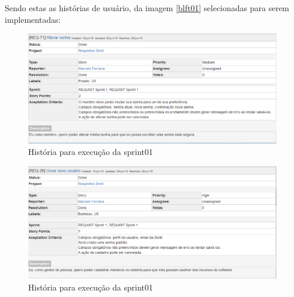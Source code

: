 Sendo estas as histórias de usuário, da imagem \ref{blft01} selecionadas para serem implementadas: 


\begin{figure}[H]
    \centering
    \includegraphics[keepaspectratio=true,scale=0.6]{figuras/us01.eps}
    \caption[História da sprint 01]{História para execução da sprint01}
\end{figure}

\begin{figure}[H]
    \centering
    \includegraphics[keepaspectratio=true,scale=0.6]{figuras/us02.eps}
    \caption[História da sprint 01]{História para execução da sprint01}
\end{figure}

